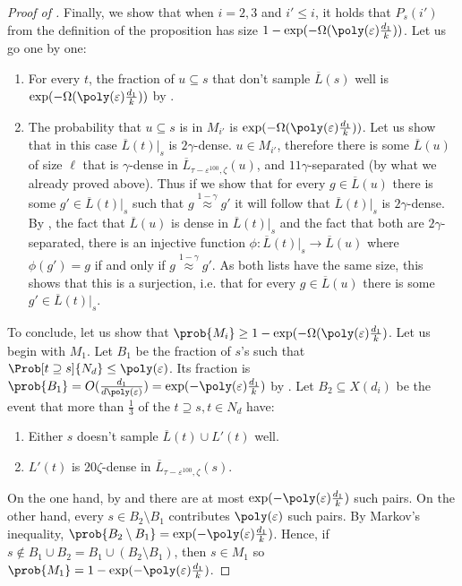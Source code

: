 \begin{proof}[Proof of ]
    Finally, we show that when \(i=2,3\) and \(i' \leq i\), it holds that
    \(P_s(i')\) from the definition of the proposition has size \(1-\exp(-\Omega(\poly(\varepsilon)\frac{d_1}{k}))\). Let us go one by one:
    \begin{enumerate}
        \item For every \(t\), the fraction of \(u \subseteq s\) that don't sample \(\overline{L}(s)\) well is \(\exp(-\Omega(\poly(\varepsilon)\frac{d_1}{k}))\) by . %
        \item The probability that \(u \subseteq s\) is in \(M_{i'}\) is  \(\exp(-\Omega(\poly(\varepsilon)\frac{d_1}{k}))\). Let us show that in this case \(\overline{L}(t)|_s\) is \(2\gamma\)-dense. \(u \in M_{i'}\), therefore there is some \(\overline{L}(u)\) of size \(\ell\) that is \(\gamma\)-dense in \(\overline{L}_{\tau-\varepsilon^{100},\zeta}(u)\), and \(11\gamma\)-separated (by what we already proved above). Thus if we show that for every \(g \in \overline{L}(u)\) there is some \(g' \in \overline{L}(t)|_s\) such that \(g \overset{1-\gamma}{\approx} g'\) it will follow that \(\overline{L}(t)|_s\) is \(2\gamma\)-dense. By , the fact that \(\overline{L}(u)\) is dense in \(\overline{L}(t)|_s\) and the fact that both are \(2\gamma\)-separated, there is an injective function \(\phi:\overline{L}(t)|_s \to \overline{L}(u)\) where \(\phi(g') = g\) if and only if \(g \overset{1-\gamma}{\approx} g'\). As both lists have the same size, this shows that this is a surjection, i.e. that for every \(g \in \overline{L}(u)\) there is some \(g' \in \overline{L}(t)|_s\).
    \end{enumerate}
    
    To conclude, let us show that \(\prob{M_i} \geq 1- \exp(-\Omega(\poly(\varepsilon)\frac{d_1}{k})\). Let us begin with \(M_1\). Let \(B_1\) be the fraction of \(s\)'s such that \(\Prob[t \supseteq s]{N_d} \leq \poly(\varepsilon)\). Its fraction is \(\prob{B_1} = O(\frac{d_1}{d\poly(\varepsilon)}) = \exp(-\poly(\varepsilon)\frac{d_1}{k})\) by . Let \(B_2 \subseteq X(d_i)\) be the event that more than \(\frac{1}{3}\) of the \(t \supseteq s, t\in N_d\) have:
    \begin{enumerate}
        \item Either \(s\) doesn't sample \(\overline{L}(t) \cup L'(t)\) well.
        \item \(L'(t)\) is \(20\zeta\)-dense in \(\overline{L}_{\tau-\varepsilon^{100},\zeta}(s)\).
    \end{enumerate}
    On the one hand, by  and  there are at most \(\exp(-\poly(\varepsilon)\frac{d_1}{k})\) such pairs. On the other hand, every \(s \in B_2 \setminus B_1\) contributes \(\poly(\varepsilon)\) such pairs. By Markov's inequality, \(\prob{B_2 \setminus B_1} = \exp(-\poly(\varepsilon)\frac{d_1}{k})\). Hence, if \(s \notin B_1 \cup B_2 = B_1 \cup (B_2 \setminus B_1)\), then \(s \in M_1\) so \(\prob{M_1} =  1 - \exp(-\poly(\varepsilon)\frac{d_1}{k})\).


\end{proof}
